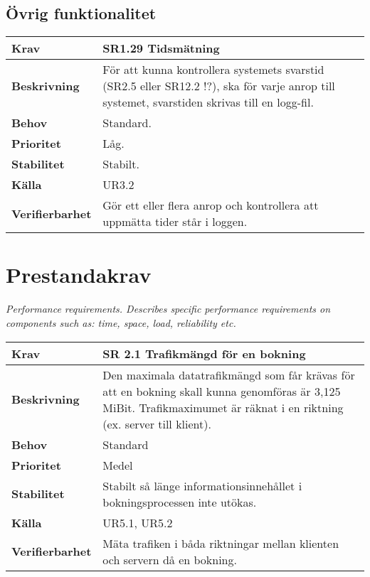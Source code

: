 \documentclass[a4paper, twoside, 11pt, titlepage]{article}
\begin{document}
	\subsection{Övrig funktionalitet}


	\begin{tabular} { p{2.6cm} p{12.5cm} }
		\hline
		\sffamily\textbf{Krav} & \sffamily\textbf{SR1.29 Tidsmätning } \\
		\hline
		\sffamily\textbf{Beskrivning} & För att kunna kontrollera systemets svarstid (SR2.5 eller SR12.2 !?), ska för varje anrop till systemet, svarstiden skrivas till en logg-fil.  \\
		\hline
		\sffamily\textbf{Behov} & Standard.  \\
		\hline
		\sffamily\textbf{Prioritet} & Låg.  \\
		\hline
		\sffamily\textbf{Stabilitet} & Stabilt.  \\
		\hline
		\sffamily\textbf{Källa} & UR3.2  \\
		\hline
		\sffamily\textbf{Verifierbarhet} & Gör ett eller flera anrop och kontrollera att uppmätta tider står i loggen.  \\
		\hline
	\end{tabular}


\clearpage
\section{Prestandakrav}


\emph{Performance requirements. Describes specific performance requirements on components such as: time, space, load, reliability etc.}

\begin{tabular} { p{2.6cm} p{12.5cm} }
	\hline
	\sffamily\textbf{Krav} & \sffamily\textbf{SR 2.1 Trafikmängd för en bokning } \\
	\hline
	\sffamily\textbf{Beskrivning} & Den maximala datatrafikmängd som får krävas för att en bokning skall kunna genomföras är 3,125 MiBit. Trafikmaximumet är räknat i en riktning (ex. server till klient).  \\
	\hline
	\sffamily\textbf{Behov} & Standard  \\
	\hline
	\sffamily\textbf{Prioritet} & Medel  \\
	\hline
	\sffamily\textbf{Stabilitet} & Stabilt så länge informationsinnehållet i bokningsprocessen inte utökas.  \\
	\hline
	\sffamily\textbf{Källa} & UR5.1, UR5.2  \\
	\hline
	\sffamily\textbf{Verifierbarhet} & Mäta trafiken i båda riktningar mellan klienten och servern då en bokning.  \\
	\hline
\end{tabular}
\vspace{6mm}
\end{document}
